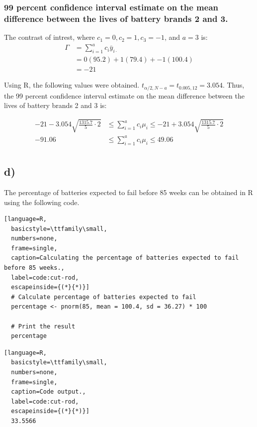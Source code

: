 \documentclass{article}
\begin{document}
\subsubsection*{99 percent confidence interval estimate on the mean difference between the lives of battery brands 2 and 3.}
The contrast of intrest, where $c_1 = 0, c_2 = 1, c_3 = -1$, and $a = 3$ is:
\begin{align*}
    \Gamma &=  \sum_{i=1}^{a} c_i \bar{y}_{i \cdot} \\
                &= 0(95.2) + 1(79.4) + -1(100.4) \\
                &= -21 
    \end{align*}
\begin{flushleft}
    Using R, the following values were obtained. $t_{\alpha/2,N-a} = t_{0.005,12} = 3.054$.
    Thus, the 99 percent confidence interval estimate on the mean difference between the lives of battery brands 2 and 3 is:
\end{flushleft}
\begin{align*}
    -21 - 3.054 \sqrt{\frac{1315.7}{5} \cdot 2}
    &\leq \sum_{i=1}^{a} c_i \mu_i \leq
    -21 + 3.054 \sqrt{\frac{1315.7}{5} \cdot 2} \\
    -91.06
    &\leq \sum_{i=1}^{a} c_i \mu_i \leq
    49.06 \\
\end{align*}
\subsection*{d)}
The percentage of batteries expected to fail before 85 weeks can be obtained in R using the following code.
\begin{lstlisting}[language=R, 
  basicstyle=\ttfamily\small,
  numbers=none, 
  frame=single, 
  caption=Calculating the percentage of batteries expected to fail before 85 weeks.,
  label=code:cut-rod,
  escapeinside={(*}{*)}]
  # Calculate percentage of batteries expected to fail
  percentage <- pnorm(85, mean = 100.4, sd = 36.27) * 100
  
  # Print the result
  percentage
\end{lstlisting}
\begin{lstlisting}[language=R, 
  basicstyle=\ttfamily\small,
  numbers=none, 
  frame=single, 
  caption=Code output.,
  label=code:cut-rod,
  escapeinside={(*}{*)}]
  33.5566
\end{lstlisting}


\clearpage
\end{document}
